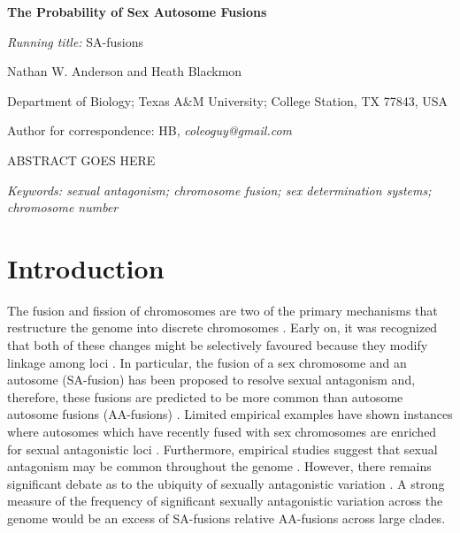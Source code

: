 \documentclass[12pt]{article}
\begin{document}
\linenumbers


\begin{center}
\textbf{The Probability of Sex Autosome Fusions}
\end{center}

\vfill
\noindent
\textit{Running title:} SA-fusions

\vfill
\noindent
Nathan W. Anderson and Heath Blackmon

\noindent
Department of Biology; Texas A\&M University; College Station, TX 77843, USA

\vfill



\noindent
Author for correspondence: HB, \textit{coleoguy@gmail.com}
\vfill

\clearpage


ABSTRACT GOES HERE


\bigskip
\noindent
\textit{Keywords: sexual antagonism; chromosome fusion; sex determination systems; chromosome number}







\section{Introduction}

The fusion and fission of chromosomes are two of the primary mechanisms that restructure the genome into discrete chromosomes \citep{blackmon2019}.
Early on, it was recognized that both of these changes might be selectively favoured because they modify linkage among loci \citep{white1977,stebbins1971}.
In particular, the fusion of a sex chromosome and an autosome (SA-fusion) has been proposed to resolve sexual antagonism and, therefore, these fusions are predicted to be more common than autosome autosome fusions (AA-fusions) \citep{charlesworth1980}.
Limited empirical examples have shown instances where autosomes which have recently fused with sex chromosomes are enriched for sexual antagonistic loci \citep{zhou2012}.
Furthermore, empirical studies suggest that sexual antagonism may be common throughout the genome \citep{innocenti2010sexually,cheng2016sex}.
However, there remains significant debate as to the ubiquity of sexually antagonistic variation \citep{kasimatis2019limits,ponnikas2018sex}.
A strong measure of the frequency of significant sexually antagonistic variation across the genome would be an excess of SA-fusions relative AA-fusions across large clades.
\end{document}
